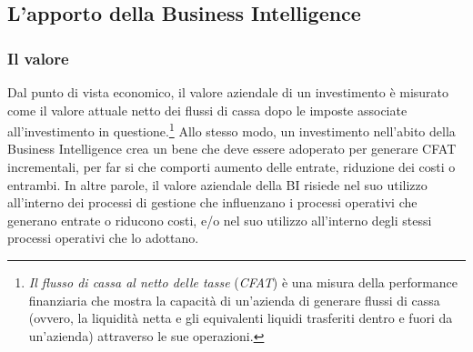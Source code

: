 \subsection{L'apporto della Business Intelligence}

\subsubsection{Il valore}

Dal punto di vista economico, il valore aziendale di un investimento è misurato come il valore attuale netto dei flussi di cassa dopo le imposte associate all'investimento in questione.\footnote{\textit{Il flusso di cassa al netto delle tasse} (\textit{CFAT}) è una misura della performance finanziaria che mostra la capacità di un'azienda di generare flussi di cassa (ovvero, la liquidità netta e gli equivalenti liquidi trasferiti dentro e fuori da un'azienda) attraverso le sue operazioni.\cite{cfat_definition}}
Allo stesso modo, un investimento nell'abito della Business Intelligence crea un bene che deve essere adoperato per generare CFAT incrementali, per far si che comporti aumento delle entrate, riduzione dei costi o entrambi. In altre parole, il valore aziendale della BI risiede nel suo utilizzo all'interno dei processi di gestione che influenzano i processi operativi che generano entrate o riducono costi, e/o nel suo utilizzo all'interno degli stessi processi operativi che lo adottano.\cite{decisionpath_bi_value}

